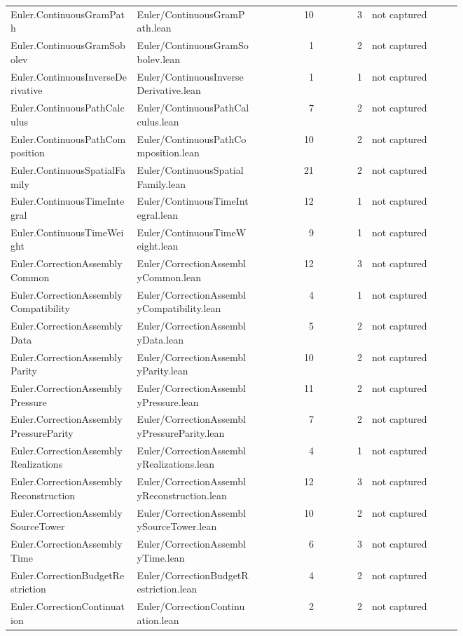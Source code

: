 \documentclass[10pt]{article}
\begin{document}
\begin{longtable}{p{0.28\linewidth}p{0.27\linewidth}r r p{0.20\linewidth}}
Euler.ContinuousGramPath & Euler/ContinuousGramPath.lean & 10 & 3 & not captured\\
Euler.ContinuousGramSobolev & Euler/ContinuousGramSobolev.lean & 1 & 2 & not captured\\
Euler.ContinuousInverseDerivative & Euler/ContinuousInverseDerivative.lean & 1 & 1 & not captured\\
Euler.ContinuousPathCalculus & Euler/ContinuousPathCalculus.lean & 7 & 2 & not captured\\
Euler.ContinuousPathComposition & Euler/ContinuousPathComposition.lean & 10 & 2 & not captured\\
Euler.ContinuousSpatialFamily & Euler/ContinuousSpatialFamily.lean & 21 & 2 & not captured\\
Euler.ContinuousTimeIntegral & Euler/ContinuousTimeIntegral.lean & 12 & 1 & not captured\\
Euler.ContinuousTimeWeight & Euler/ContinuousTimeWeight.lean & 9 & 1 & not captured\\
Euler.CorrectionAssemblyCommon & Euler/CorrectionAssemblyCommon.lean & 12 & 3 & not captured\\
Euler.CorrectionAssemblyCompatibility & Euler/CorrectionAssemblyCompatibility.lean & 4 & 1 & not captured\\
Euler.CorrectionAssemblyData & Euler/CorrectionAssemblyData.lean & 5 & 2 & not captured\\
Euler.CorrectionAssemblyParity & Euler/CorrectionAssemblyParity.lean & 10 & 2 & not captured\\
Euler.CorrectionAssemblyPressure & Euler/CorrectionAssemblyPressure.lean & 11 & 2 & not captured\\
Euler.CorrectionAssemblyPressureParity & Euler/CorrectionAssemblyPressureParity.lean & 7 & 2 & not captured\\
Euler.CorrectionAssemblyRealizations & Euler/CorrectionAssemblyRealizations.lean & 4 & 1 & not captured\\
Euler.CorrectionAssemblyReconstruction & Euler/CorrectionAssemblyReconstruction.lean & 12 & 3 & not captured\\
Euler.CorrectionAssemblySourceTower & Euler/CorrectionAssemblySourceTower.lean & 10 & 2 & not captured\\
Euler.CorrectionAssemblyTime & Euler/CorrectionAssemblyTime.lean & 6 & 3 & not captured\\
Euler.CorrectionBudgetRestriction & Euler/CorrectionBudgetRestriction.lean & 4 & 2 & not captured\\
Euler.CorrectionContinuation & Euler/CorrectionContinuation.lean & 2 & 2 & not captured\\

\end{longtable}
\end{document}
